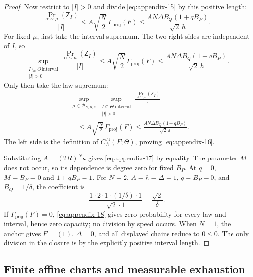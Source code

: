 \begin{proof}
Now restrict to $|I|>0$ and divide \eqref{eq:appendix-15} by this positive length:
\begin{equation}
\frac{\Pr_{\alpha\sim\mu}(\mathsf Z_I)}{|I|}
\leq A\sqrt{\frac N2}\,\Gamma_{\mathrm{proj}}(F)
\leq\frac{AN\Delta B_Q(1+qB_P)}{\sqrt2\,h}.
\label{eq:appendix-21}
\end{equation}
For fixed $\mu$, first take the interval supremum.  The two right sides are
independent of $I$, so
\begin{equation}
\sup_{\substack{I\subseteq\Theta\ \mathrm{interval}\\|I|>0}}
\frac{\Pr_{\alpha\sim\mu}(\mathsf Z_I)}{|I|}
\leq A\sqrt{\frac N2}\,\Gamma_{\mathrm{proj}}(F)
\leq\frac{AN\Delta B_Q(1+qB_P)}{\sqrt2\,h}.
\label{eq:appendix-22}
\end{equation}
Only then take the law supremum:
\begin{equation}
\begin{aligned}
&\sup_{\mu\in\mathcal D_{N,R,\kappa}}
 \sup_{\substack{I\subseteq\Theta\ \mathrm{interval}\\|I|>0}}
 \frac{\Pr_{\alpha\sim\mu}(\mathsf Z_I)}{|I|}\\
&\quad\leq A\sqrt{\frac N2}\,\Gamma_{\mathrm{proj}}(F)
\leq\frac{AN\Delta B_Q(1+qB_P)}{\sqrt2\,h}.
\end{aligned}
\label{eq:appendix-23}
\end{equation}
The left side is the definition of
$C^{\mathrm{Pf}}_{\mathcal D}(F;\Theta)$, proving \eqref{eq:appendix-16}.

Substituting $A=(2R)^N\kappa$ gives \eqref{eq:appendix-17} by equality.  The parameter $M$
does not occur, so its dependence is degree zero for fixed $B_P$.  At $q=0$,
$M=B_P=0$ and $1+qB_P=1$.  For
$N=2$, $A=h=\Delta=1$, $q=B_P=0$, and $B_Q=1/\delta$, the coefficient is
\begin{equation}
\frac{1\cdot2\cdot1\cdot(1/\delta)\cdot1}{\sqrt2\cdot1}
=\frac{\sqrt2}{\delta}.
\label{eq:appendix-24}
\end{equation}
If $\Gamma_{\mathrm{proj}}(F)=0$, \eqref{eq:appendix-18} gives zero probability for every
law and interval, hence zero capacity; no division by speed occurs.  When
$N=1$, the anchor gives $F=(1)$, $\Delta=0$, and all displayed chains reduce
to $0\leq0$.  The only division in the closure is by the explicitly positive
interval length.
\end{proof}

\subsection{Finite affine charts and measurable exhaustion}
\label{app:affine-charts}


